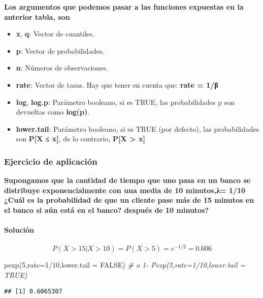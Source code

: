 \documentclass[
]{article}
\newenvironment{Shaded}{\begin{snugshade}}{\end{snugshade}}
\newcommand{\AttributeTok}[1]{\textcolor[rgb]{0.77,0.63,0.00}{#1}}
\newcommand{\CommentTok}[1]{\textcolor[rgb]{0.56,0.35,0.01}{\textit{#1}}}
\newcommand{\ConstantTok}[1]{\textcolor[rgb]{0.00,0.00,0.00}{#1}}
\newcommand{\DecValTok}[1]{\textcolor[rgb]{0.00,0.00,0.81}{#1}}
\newcommand{\FunctionTok}[1]{\textcolor[rgb]{0.00,0.00,0.00}{#1}}
\newcommand{\NormalTok}[1]{#1}
\newcommand{\SpecialCharTok}[1]{\textcolor[rgb]{0.00,0.00,0.00}{#1}}
\begin{document}
\textbf{Los argumentos que podemos pasar a las funciones expuestas en la
anterior tabla, son}

\begin{itemize}
\item
  \textbf{x}, \textbf{q}: Vector de cuantiles.
\item
  \textbf{p}: Vector de probabilidades.
\item
  \textbf{n}: Números de observaciones.
\item
  \textbf{rate}: Vector de tasas. Hay que tener en cuenta que:
  \textbf{rate = 1/β}
\item
  \textbf{log}, \textbf{log.p}: Parámetro booleano, si es TRUE, las
  probabilidades p son devueltas como \textbf{log(p)}.
\item
  \textbf{lower.tail}: Parámetro booleano, si es TRUE (por defecto), las
  probabilidades son \textbf{P{[}X ≤ x{]}}, de lo contrario,
  \textbf{P{[}X \textgreater{} x{]}}
\end{itemize}

\hypertarget{ejercicio-de-aplicaciuxf3n-2}{%
\subsubsection{Ejercicio de
aplicación}\label{ejercicio-de-aplicaciuxf3n-2}}

\textbf{Supongamos que la cantidad de tiempo que uno pasa en un banco se
distribuye exponencialmente con una media de 10 minutos,λ= 1/10 ¿Cuál es
la probabilidad de que un cliente pase más de 15 minutos en el banco si
aún está en el banco? después de 10 minutos?}

\hypertarget{soluciuxf3n-2}{%
\paragraph{Solución}\label{soluciuxf3n-2}}

\[P(X>15|X>10)=P(X>5)=e^{-1/2} = 0.606\]

\begin{Shaded}
\begin{Highlighting}[]
\FunctionTok{pexp}\NormalTok{(}\DecValTok{5}\NormalTok{,}\AttributeTok{rate=}\DecValTok{1}\SpecialCharTok{/}\DecValTok{10}\NormalTok{,}\AttributeTok{lower.tail =} \ConstantTok{FALSE}\NormalTok{) }\CommentTok{\# o 1{-} Pexp(5,rate=1/10,lower.tail = TRUE)}
\end{Highlighting}
\end{Shaded}

\begin{verbatim}
## [1] 0.6065307
\end{verbatim}
\end{document}
